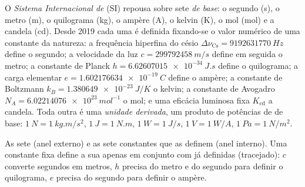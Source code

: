 \begin{definition}\label{def:b1:units-dimensions:si}
O \emph{Sistema Internacional de } (SI) repousa sobre sete
\emph{ de base}: o segundo (\unit{s}), o metro (\unit{m}), o
quilograma (\unit{kg}), o ampère (\unit{A}), o kelvin (\unit{K}), o
mol (\unit{mol}) e a candela (\unit{cd}). Desde 2019 cada uma é
definida fixando-se o valor numérico de uma constante da natureza: a
frequência hiperfina do césio $\Delta\nu_{\mathrm{Cs}} = \qty{9192631770}{Hz}$
define o segundo; a velocidade da luz $c = \qty{299792458}{m/s}$ define
em seguida o metro; a constante de Planck
$h = \qty{6.62607015e-34}{J.s}$ define o quilograma; a carga
elementar $e = \qty{1.602176634e-19}{C}$ define o ampère; a constante de Boltzmann
$k_B = \qty{1.380649e-23}{J/K}$ o kelvin; a constante de Avogadro
$N_A = \qty{6.02214076e23}{mol^{-1}}$ o mol; e uma eficácia luminosa
fixa $K_{\mathrm{cd}}$ a candela. Toda outra  é uma
\emph{unidade derivada}, um produto de potências de
 de base: $\qty{1}{N} = \qty{1}{kg.m/s^2}$, $\qty{1}{J} = \qty{1}{N.m}$,
$\qty{1}{W} = \qty{1}{J/s}$, $\qty{1}{V} = \qty{1}{W/A}$,
$\qty{1}{Pa} = \qty{1}{N/m^2}$.
\end{definition}

\begin{omfigure}

{\small As sete  (anel externo) e as sete constantes que
as definem (anel interno). Uma constante fixa define a sua  apenas
em conjunto com  já definidas (tracejado): $c$ converte segundos em
metros, $h$ precisa do metro e do segundo para definir o quilograma, $e$
precisa do segundo para definir o ampère.}
\end{omfigure}

